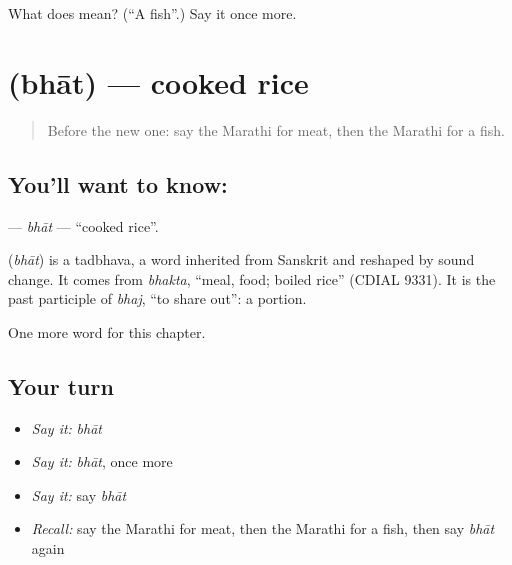 \begin{tcolorbox}[breakable,colback=teal!4,colframe=teal!35!black,title={Before you move on}]
What does  mean? (\textquotedblleft{}A fish\textquotedblright{}.) Say it once more.
\end{tcolorbox}
\section[\texorpdfstring{\mr{भात} (bhāt)}{भात (bhāt)}]{ (bhāt) — cooked rice}

\label{lesson:MR-C85-bhat}



\begin{quote}
Before the new one: say the Marathi for meat, then the Marathi for a fish.
\end{quote}

\subsection*{You'll want to know: }
\textbf{} — \emph{bhāt} — \textquotedblleft{}cooked rice\textquotedblright{}.

\begin{cousinweb}
\textbf{} (\emph{bhāt}) is a tadbhava, a word inherited from Sanskrit and reshaped by sound change. It comes from \emph{bhakta}, \textquotedblleft{}meal, food; boiled rice\textquotedblright{} (CDIAL 9331). It is the past participle of \emph{bhaj}, \textquotedblleft{}to share out\textquotedblright{}: a portion.
\end{cousinweb}

\begin{grammarlens}[title={What you've built}]
One more word for this chapter.
\end{grammarlens}

\subsection*{Your turn}
\begin{itemize}
\raggedright
  \item \emph{Say it:} \emph{bhāt}
  \item \emph{Say it:} \emph{bhāt}, once more
  \item \emph{Say it:} say \emph{bhāt}
  \item \emph{Recall:} say the Marathi for meat, then the Marathi for a fish, then say \emph{bhāt} again
\end{itemize}

